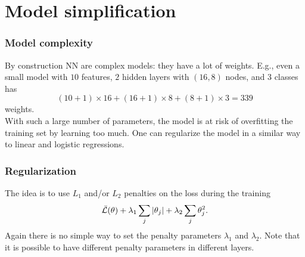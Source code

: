 \section{Model simplification}
\begin{frame}
\frametitle{Model complexity}
By construction NN are complex models: they have a lot of weights. E.g., even a small model with $10$ features, $2$ hidden layers with $(16,8)$ nodes, and 3 classes has
$$
(10+1)\times 16 + (16+1)\times 8 + (8+1)\times 3 = 339
$$
weights. \\
\vspace{0.3cm}
With such a large number of parameters, the model is at risk of overfitting the training set by learning too much. One can regularize the model in a similar way to linear and logistic regressions.
\end{frame}
\begin{frame}
\frametitle{Regularization}
The idea is to use $L_1$ and/or $L_2$ penalties on the loss during the training
$$
\bar{\cal L}(\theta) + \lambda_1 \sum_{j} |\theta_j| + \lambda_2 \sum_{j} \theta_j^2.
$$
Again there is no simple way to set the penalty parameters $\lambda_1$ and $\lambda_2$. Note that it is possible to have different penalty parameters in different layers.
\end{frame}



